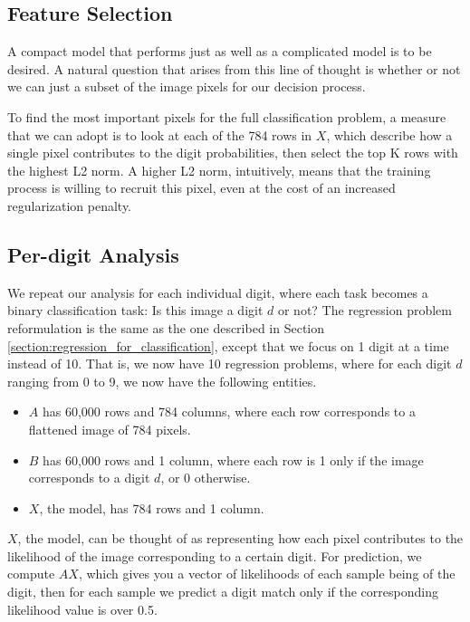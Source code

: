 \documentclass[letterpaper, 10 pt, conference]{ieeeconf}  %
\begin{document}
\subsection{Feature Selection}
\label{section:feature_selection}
A compact model that performs just as well as a complicated model is to be desired.
A natural question that arises from this line of thought is whether or not we can just a subset of the image pixels for our decision process.

To find the most important pixels for the full classification problem, a measure that we can adopt is to look at each of the 784 rows in $X$, which describe how a single pixel contributes to the digit probabilities, then select the top K rows with the highest L2 norm. A higher L2 norm, intuitively, means that the training process is willing to recruit this pixel, even at the cost of an increased regularization penalty.

\subsection{Per-digit Analysis}
\label{section:per_digit_analysis}
We repeat our analysis for each individual digit, where each task becomes a binary classification task: Is this image a digit $d$ or not? The regression problem reformulation is the same as the one described in Section \ref{section:regression_for_classification}, except that we focus on 1 digit at a time instead of 10. That is, we now have 10 regression problems, where for each digit $d$ ranging from 0 to 9, we now have the following entities.

\begin{itemize}
    \item $A$ has 60,000 rows and 784 columns, where each row corresponds to a flattened image of 784 pixels.
    \item $B$ has 60,000 rows and 1 column, where each row is 1 only if the image corresponds to a digit $d$, or 0 otherwise.
    \item $X$, the model, has 784 rows and 1 column.
\end{itemize}

$X$, the model, can be thought of as representing how each pixel contributes to the likelihood of the image corresponding to a certain digit.
For prediction, we compute $AX$, which gives you a vector of likelihoods of each sample being of the digit, then for each sample we predict a digit match only if the corresponding likelihood value is over 0.5.  
\end{document}
